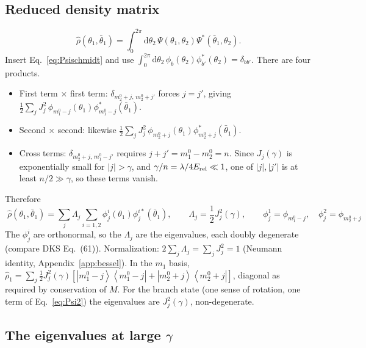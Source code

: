 \documentclass[aps,pra,onecolumn,notitlepage,nofootinbib,11pt]{revtex4-2}
\newcommand{\ketbra}[2]{\left|#1\right\rangle\!\left\langle#2\right|}
\newcommand{\dd}{\mathrm{d}}
\newcommand{\Erel}{E_{\rm rel}}
\begin{document}
\subsection{Reduced density matrix}

\begin{equation}
\hat\rho(\theta_{1},\bar\theta_{1})=\int_{0}^{2\pi}\dd\theta_{2}\,
\Psi(\theta_{1},\theta_{2})\Psi^{*}(\bar\theta_{1},\theta_{2}).
\label{eq:rhodef}
\end{equation}
Insert Eq.~\eqref{eq:Psischmidt} and use
$\int_{0}^{2\pi}\dd\theta_{2}\,\phi_{b}(\theta_{2})\phi_{b'}^{*}(\theta_{2})=\delta_{bb'}$.
There are four products.
\begin{itemize}
\item First term $\times$ first term: $\delta_{m_{2}^{0}+j,\,m_{2}^{0}+j'}$ forces $j=j'$,
giving $\frac12\sum_{j}J_{j}^{2}\,\phi_{m_{1}^{0}-j}(\theta_{1})\phi^{*}_{m_{1}^{0}-j}(\bar\theta_{1})$.
\item Second $\times$ second: likewise
$\frac12\sum_{j}J_{j}^{2}\,\phi_{m_{2}^{0}+j}(\theta_{1})\phi^{*}_{m_{2}^{0}+j}(\bar\theta_{1})$.
\item Cross terms: $\delta_{m_{2}^{0}+j,\,m_{1}^{0}-j'}$ requires $j+j'=m_{1}^{0}-m_{2}^{0}=n$.
Since $J_{j}(\gamma)$ is exponentially small for $|j|>\gamma$, and
$\gamma/n=\lambda/4\Erel\ll1$, one of $|j|,|j'|$ is at least $n/2\gg\gamma$, so these
terms vanish.
\end{itemize}
Therefore
\begin{equation}
\boxed{\;
\hat\rho(\theta_{1},\bar\theta_{1})=\sum_{j}\Lambda_{j}\sum_{i=1,2}\phi^{i}_{j}(\theta_{1})
\phi^{i*}_{j}(\bar\theta_{1}),\qquad\Lambda_{j}=\frac12J_{j}^{2}(\gamma),\qquad
\phi^{1}_{j}=\phi_{m_{1}^{0}-j},\quad\phi^{2}_{j}=\phi_{m_{2}^{0}+j}\;}
\label{eq:rho1WKB}
\end{equation}
The $\phi^{i}_{j}$ are orthonormal, so the $\Lambda_{j}$ are the eigenvalues, each doubly
degenerate (compare DKS Eq.~(61)). Normalization: $2\sum_{j}\Lambda_{j}=\sum_{j}J_{j}^{2}=1$
(Neumann identity, Appendix~\ref{app:bessel}). In the $m_{1}$ basis,
$\hat\rho_{1}=\sum_{j}\frac12J_{j}^{2}(\gamma)\left[\ketbra{m_{1}^{0}-j}{m_{1}^{0}-j}
+\ketbra{m_{2}^{0}+j}{m_{2}^{0}+j}\right]$, diagonal as required by conservation of $M$.
For the branch state (one sense of rotation, one term of Eq.~\eqref{eq:Psi2}) the
eigenvalues are $J_{j}^{2}(\gamma)$, non-degenerate.

\subsection{The eigenvalues at large $\gamma$}
\end{document}
